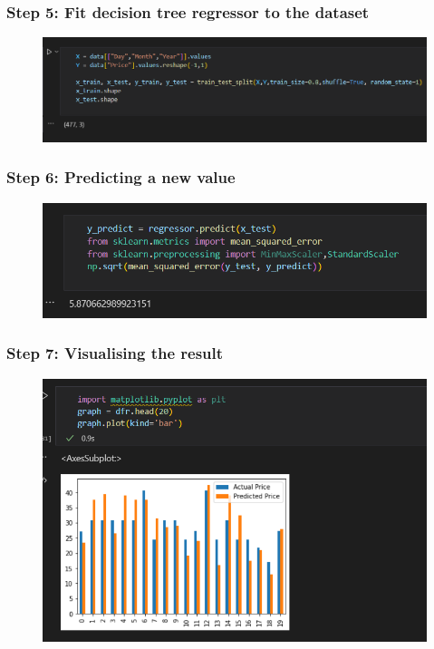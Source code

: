 \subsubsection{Step 5: Fit decision tree regressor to the dataset}
\begin{figure}[H]
	\centering
	\includegraphics[width=160mm]{images/fit.png}
	\label{figfit} %
\end{figure}


\subsubsection{Step 6: Predicting a new value}
\begin{figure}[H]
	\centering
	\includegraphics[width=160mm]{images/predict.png}
	\label{figpredict} %
\end{figure}


\subsubsection{Step 7: Visualising the result}
\begin{figure}[H]
	\centering
	\includegraphics[width=160mm]{images/visualize.png}
	\label{figvisualize} %
\end{figure}



